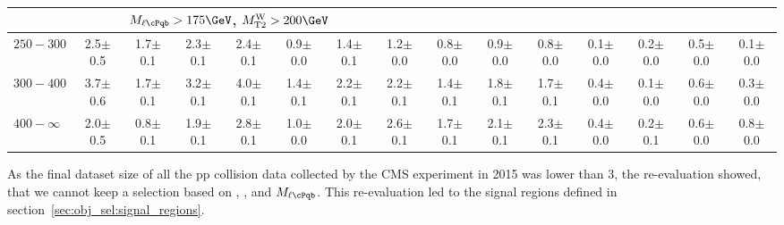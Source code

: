 \begin{table}
\begin{center}
\begin{tabular}{|l|c|cccccc|ccc|cccc|}
\hline
 & & \multicolumn{13}{l|}{$M_{\ell \cPqb}>175\GeV$, $\MTtW>200\GeV$} \\
\hline
 $250-300$    & 2.5$\pm$0.5 & 1.7$\pm$0.1 & 2.3$\pm$0.1 & 2.4$\pm$0.1 & 0.9$\pm$0.0 & 1.4$\pm$0.1 & 1.2$\pm$0.0 & 0.8$\pm$0.0 & 0.9$\pm$0.0 & 0.8$\pm$0.0 & 0.1$\pm$0.0 & 0.2$\pm$0.0 & 0.5$\pm$0.0 & 0.1$\pm$0.0 \\
 $300-400$    & 3.7$\pm$0.6 & 1.7$\pm$0.1 & 3.2$\pm$0.1 & 4.0$\pm$0.1 & 1.4$\pm$0.1 & 2.2$\pm$0.1 & 2.2$\pm$0.1 & 1.4$\pm$0.1 & 1.8$\pm$0.1 & 1.7$\pm$0.1 & 0.4$\pm$0.0 & 0.1$\pm$0.0 & 0.6$\pm$0.0 & 0.3$\pm$0.0 \\
 $400-\infty$ & 2.0$\pm$0.5 & 0.8$\pm$0.1 & 1.9$\pm$0.1 & 2.8$\pm$0.1 & 1.0$\pm$0.0 & 2.0$\pm$0.1 & 2.6$\pm$0.1 & 1.7$\pm$0.1 & 2.1$\pm$0.1 & 2.3$\pm$0.1 & 0.4$\pm$0.0 & 0.2$\pm$0.1 & 0.6$\pm$0.0 & 0.8$\pm$0.0 \\
 \hline
\end{tabular}
\end{center}
\end{table}

As the final dataset size of all the pp collision data collected by the CMS experiment in 2015 was lower than 3\fbinv, the re-evaluation showed, that we cannot keep a selection based on \MET, \MTtW, and $M_{\ell \cPqb}$. This re-evaluation led to the signal regions defined in section~\ref{sec:obj_sel:signal_regions}.
